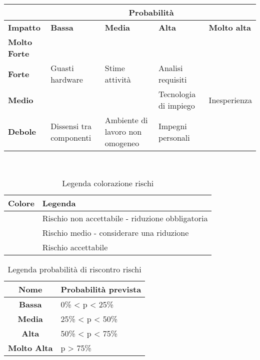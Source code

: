\documentclass{scalatekids-article}
\begin{document}
\begin{table}[H]
  \centering
  \begin{tabular}{|m{2cm}|m{3cm}|m{3cm}|m{3cm}|m{3cm}|}
    \hline
    & \multicolumn{4}{|c|}{\textbf{Probabilità}}\\
    \hline
    \bf Impatto & \bf Bassa & \bf Media & \bf Alta & \textbf{Molto alta} \\
    \hline
    \bf Molto Forte & \cellcolor{red!50} & \cellcolor{red!50} & \cellcolor{red!50} &\cellcolor{red!50} \\
    \hline
    \bf Forte & \cellcolor{yellow!50}Guasti hardware & \cellcolor{yellow!50}Stime attività & \cellcolor{red!50}Analisi requisiti &\cellcolor{red!50}\\[8pt]
    \hline
    \bf Medio & \cellcolor{green!50} & \cellcolor{yellow!50} &\cellcolor{yellow!50}Tecnologia di impiego &\cellcolor{red!50}Inesperienza \\[8pt]
    \hline
    \bf Debole & \cellcolor{green!50}Dissensi tra componenti & \cellcolor{green!50}Ambiente di lavoro non omogeneo &\cellcolor{yellow!50}Impegni personali &\cellcolor{yellow!50} \\
    \hline
  \end{tabular} \\
\end{table}
\begin{table}[H]
  \centering
  \caption*{Legenda colorazione rischi}
  \begin{tabular}{|c|l|}
    \hline \bf Colore & \bf Legenda \\
    \hline \cellcolor{red! 50} & Rischio non accettabile - riduzione obbligatoria \\
    \hline \cellcolor{yellow! 50} & Rischio medio - considerare una riduzione \\
    \hline \cellcolor{green! 50} & Rischio accettabile \\
    \hline
  \end{tabular}
\end{table}
\begin{table}[H]
  \centering
  \caption*{Legenda probabilità di riscontro rischi}
  \begin{tabular}{|c|l|}
    \hline \bf Nome & \bf Probabilità prevista \\
    \hline \textbf{Bassa} & 0\% < p < 25\% \\
    \hline \textbf{Media} & 25\% < p < 50\% \\
    \hline \textbf{Alta} & 50\% < p < 75\% \\
    \hline \textbf{Molto Alta} & p > 75\% \\
    \hline
  \end{tabular}
\end{table}
\end{document}
